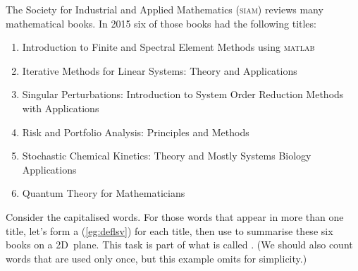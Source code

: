 The Society for Industrial and Applied Mathematics (\textsc{siam}) reviews many mathematical books.
In 2015 six of those books had the following titles:
\begin{enumerate}
\item Introduction to Finite and Spectral Element Methods using \textsc{matlab}
\item Iterative Methods for Linear Systems: Theory and Applications 
\item Singular Perturbations: Introduction to System Order Reduction Methods with Applications 
\item Risk and Portfolio Analysis: Principles and Methods 
\item Stochastic Chemical Kinetics: Theory and Mostly Systems Biology Applications
\item Quantum Theory for Mathematicians 
\end{enumerate}
Consider the capitalised words. 
For those words that appear in more than one title, let's form a  (\autoref{eg:deflsv}) for each title, then use  to summarise these six books on a 2D~plane.
This task is part of what is called  \cite[]{Berry95}.  
(We should also count words that are used only once, but this example omits for simplicity.)


